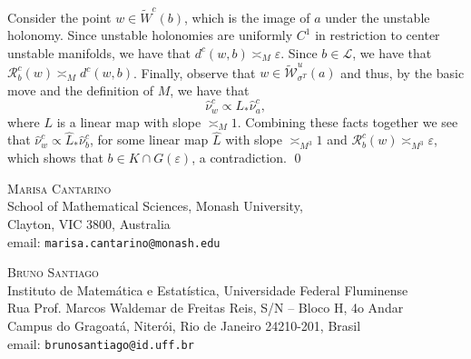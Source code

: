 \documentclass[a4paper,11pt,reqno]{amsart}
\def\tW{\widetilde W}
\newcommand{\cL}{{\mathcal L}}
\newcommand{\cW}{{\mathcal W}}
\newcommand{\cR}{{\mathcal R}}
\newcommand{\eps}{\varepsilon}
\newcommand{\w}{\widetilde{\cW}}
\theoremstyle{definition}
\begin{document}
Consider the point $w\in\tW^c(b)$, which is the image of $a$ under the unstable holonomy. Since unstable holonomies are uniformly $C^1$ in restriction to center unstable manifolds, we have that $d^c(w,b)\asymp_M\eps$. Since $b\in\cL$, we have that $\cR^c_{b}(w)\asymp_Md^c(w,b)$. Finally, observe that $w\in\w^u_{\sigma^T}(a)$ and thus, by the basic move and the definition of $M$, we have that 
\[
\hat{\nu}^c_w\propto L_*\hat{\nu}^c_a,
\]
where $L$ is a linear map with slope $\asymp_M 1$. Combining these facts together we see that $\hat{\nu}^c_w\propto\hat{L}_*\hat{\nu}^c_b$, for some linear map $\hat{L}$ with slope $\asymp_{M^3} 1$ and $\cR^c_{b}(w)\asymp_{M^3}\eps$, which shows that $b\in K\cap G(\eps)$, a contradiction. \qed
 
    



\smallskip
\begin{flushleft}

{\scshape Marisa Cantarino}\\
School of Mathematical Sciences, Monash University,\\ Clayton, VIC 3800, Australia\\
email:  \texttt{marisa.cantarino@monash.edu}

	\vspace{0.2cm}
	
	{\scshape Bruno Santiago}\\
	Instituto de Matem\'atica e Estat\'istica, Universidade Federal Fluminense\\
	Rua Prof. Marcos Waldemar de Freitas Reis, S/N -- Bloco H, 4o Andar\\
	Campus do Gragoatá, Niterói, Rio de Janeiro 24210-201, Brasil\\
	email:  \texttt{brunosantiago@id.uff.br}
	
	
\end{flushleft}
\end{document}
